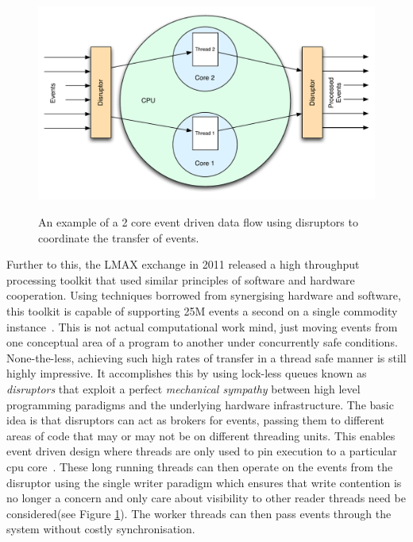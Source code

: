 \documentclass[a4paper,11pt]{scrreprt}
\begin{document}
\begin{figure}[h!]

\centering
\caption{An example of a 2 core event driven data flow using disruptors to coordinate the transfer of events.}
\includegraphics[scale=0.65] {disruptor-ex.pdf}
\label{fig:disruptor-ex}
\end{figure}

Further to this, the LMAX exchange in 2011 released a high throughput processing toolkit that used similar principles of software and hardware cooperation. Using techniques borrowed from synergising hardware and software, this toolkit is capable of supporting 25M events a second on a single commodity instance~\cite{disruptor-paper}. This is not actual computational work mind, just moving events from one conceptual area of a program to another under concurrently safe conditions. None-the-less, achieving such high rates of transfer in a thread safe manner is still highly impressive. It accomplishes this by using lock-less queues known as \textit{disruptors} that exploit a perfect \textit{mechanical sympathy} between high level programming paradigms and the underlying hardware infrastructure. The basic idea is that disruptors can act as brokers for events, passing them to different areas of code that may or may not be on different threading units. This enables event driven design where threads are only used to pin execution to a particular \acrshort{cpu} core~\cite{processor-affinity}. These long running threads can then operate on the events from the disruptor using the single writer paradigm which ensures that write contention is no longer a concern and only care about visibility to other reader threads need be considered(see Figure \ref{fig:disruptor-ex}). The worker threads can then pass events through the system without costly synchronisation.
\end{document}
